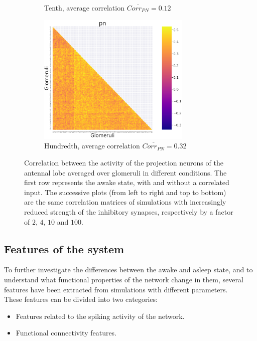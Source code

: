 \begin{figure}
\begin{subfigure}[t]{0.45\textwidth}
    \caption{Tenth, average correlation $\overline{Corr_{PN}} = 0.12$}
    \label{fig:tenth_state}
  \end{subfigure}
  \begin{subfigure}[t]{0.45\textwidth}
    \centering
    \includegraphics[width=0.8\textwidth]{correlation-hundreth-poisson-pn}
    \caption{Hundredth, average correlation $\overline{Corr_{PN}} = 0.32$}
    \label{fig:hundredth_state}
  \end{subfigure}
  \caption{Correlation between the activity of the projection neurons of the antennal lobe averaged over glomeruli in different conditions. The first row represents the awake state, with and without a correlated input. The successive plots (from left to right and top to bottom) are the same correlation matrices of simulations with increasingly reduced strength of the inhibitory synapses, respectively by a factor of $2$, $4$, $10$ and $100$.}
  \label{fig:correlation_different_conditions}
\end{figure}

  \subsection{Features of the system}
  To further investigate the differences between the awake and asleep state, and to understand what functional properties of the network change in them, several features have been extracted from simulations with different parameters.\\
  These features can be divided into two categories:

  \begin{itemize}
    \item Features related to the spiking activity of the network.
    \item Functional connectivity features.
  \end{itemize}

